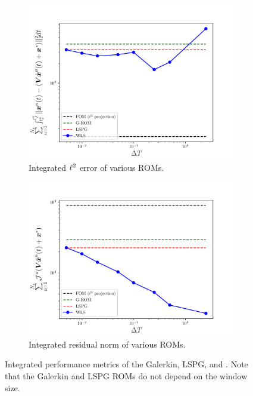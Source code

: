 \begin{figure}
\begin{center}
\begin{subfigure}[t]{0.45\textwidth}
\includegraphics[width=1.\linewidth]{figs/sod/error_vs_window_compare.pdf}
\caption{Integrated $\ell^2$ error of various ROMs.}
\label{fig:sod_error_a}
\end{subfigure}
\begin{subfigure}[t]{0.45\textwidth}
\includegraphics[width=1.\linewidth]{figs/sod/objective_vs_window_compare.pdf}
\caption{Integrated residual norm of various ROMs.} 
\label{fig:sod_error_b}
\end{subfigure}
\caption{Integrated performance metrics of the Galerkin, LSPG, and \methodAcronymROMs.  Note that the Galerkin and LSPG ROMs do not depend on the window size.} 
\label{fig:sod_error}
\end{center}
\end{figure}

